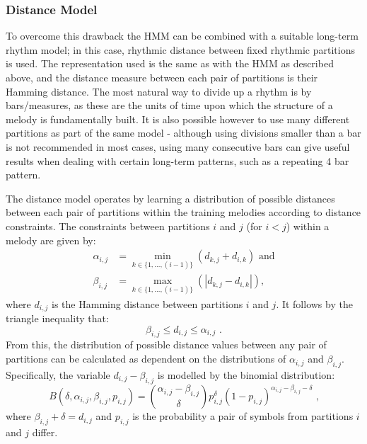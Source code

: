\documentclass[ author={Stephen Livermore-Tozer},
				supervisor={Dr. Peter Flach},
				degree={MEng},
				title={Algorithmic Co-composition Using Machine Learning},
				subtitle={},
				type={research},
				year={2016} ]{dissertation}
\begin{document}
	\subsubsection{Distance Model}
	
	To overcome this drawback the HMM can be combined with a suitable long-term rhythm model; in this case, rhythmic distance between fixed rhythmic partitions is used. The representation used is the same as with the HMM as described above, and the distance measure between each pair of partitions is their Hamming distance. The most natural way to divide up a rhythm is by bars/measures, as these are the units of time upon which the structure of a melody is fundamentally built. It is also possible however to use many different partitions as part of the same model - although using divisions smaller than a bar is not recommended in most cases, using many consecutive bars can give useful results when dealing with certain long-term patterns, such as a repeating 4 bar pattern.
	
	
	The distance model operates by learning a distribution of possible distances between each pair of partitions within the training melodies according to distance constraints. The constraints between partitions $i$ and $j$ (for $i<j$) within a melody are given by:
	\begin{equation*}
		\begin{split}
		\alpha_{i,j} &= \min_{k \in \{1,\dots,(i-1)\}} (d_{k,j} + d_{i,k}) \text{ and} \\
		\beta_{i,j} &= \max_{k \in \{1,\dots,(i-1)\}} (|d_{k,j} - d_{i,k}|),
		\end{split}
	\end{equation*}
	where $d_{i,j}$ is the Hamming distance between partitions $i$ and $j$. It follows by the triangle inequality that:
	$$\beta_{i,j} \leq d_{i,j} \leq \alpha_{i,j} \text{ .}$$
	From this, the distribution of possible distance values between any pair of partitions can be calculated as dependent on the distributions of $\alpha_{i,j}$ and $\beta_{i,j}$. Specifically, the variable $d_{i,j} - \beta_{i,j}$ is modelled by the binomial distribution:
	$$B(\delta, \alpha_{i,j}, \beta_{i,j}, p_{i,j}) = \binom{\alpha_{i,j} - \beta_{i,j}}{\delta} p_{i,j}^\delta (1-p_{i,j})^{\alpha_{i,j}-\beta_{i,j}-\delta} \text{ ,}$$
	where $\beta_{i,j} + \delta = d_{i,j}$ and $p_{i,j}$ is the probability a pair of symbols from partitions $i$ and $j$ differ. 
	
\end{document}
